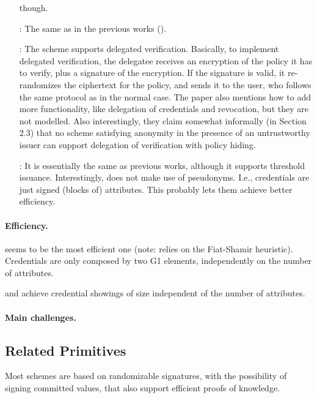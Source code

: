\begin{enumerate}
  though.
\item[\cite{cdhk15}:] The same as in the previous works (\cite{cl01,cl02,cl04}).
\item[\cite{dmm+18}:] The scheme supports delegated verification. Basically,
  to implement delegated verification, the delegatee receives an encryption of
  the policy it has to verify, plus a signature of the encryption. If the
  signature is valid, it re-randomizes the ciphertext for the policy, and
  sends it to the user, who follows the same protocol as in the normal case.
  The paper also mentions how to add more functionality, like delegation of
  credentials and revocation, but they are not modelled. Also interestingly,
  they claim somewhat informally (in Section 2.3) that no scheme satisfying
  anonymity in the presence of an untrustworthy issuer can support delegation
  of verification with policy hiding.
\item[\cite{sms+19}:] It is essentially the same as previous works, although it
  supports threshold issuance. Interestingly, \cite{sms+19} does not make use
  of pseudonyms. I.e., credentials are just signed (blocks of) attributes. This
  probably lets them achieve better efficiency. 
\end{enumerate}

\paragraph{Efficiency.}

\cite{sms+19} seems to be the most efficient one (note: relies on the
Fiat-Shamir heuristic). Credentials are only composed by two G1 elements,
independently on the number of attributes. 

\cite{cdhk15} and \cite{fhs19} achieve credential showings of size independent
of the number of attributes.

\paragraph{Main challenges.}

\subsection{Related Primitives}

Most schemes \cite{cl01,cl02,cl04,cdhk15,sms+19} are based on randomizable
signatures, with the possibility of signing committed values, that also support
efficient proofs of knowledge.

